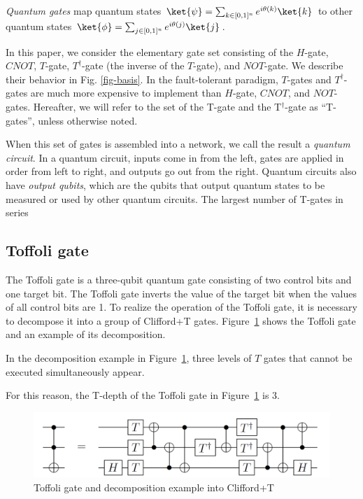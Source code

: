 \emph{Quantum gates} map quantum states $\ket{\psi} = \sum_{k \in [0,1]^n} e^{i {\theta}(k)} \ket{k}$ to
other quantum states $\ket{\phi} = \sum_{j \in [0,1]^n} e^{i {\theta}(j)} \ket{j}$.

In this paper, we consider the elementary gate set consisting of the $H$-gate, $\mathit{CNOT}$, $T$-gate, $T^{\dagger}$-gate  (the inverse of the $T$-gate), and $NOT$-gate. We describe
their behavior in Fig. \ref{fig-basis}. In the fault-tolerant paradigm, $T$-gates and $T^{\dagger}$-gates are much more expensive to implement than
$H$-gate, $CNOT$, and $NOT$-gates. Hereafter, we will refer to the set of the T-gate and the T$^{\dagger}$-gate as ``T-gates'', unless otherwise noted.

When this set of gates is assembled into a network, we call the result a \emph{quantum circuit}. In a quantum circuit, inputs come in from the left, gates are applied in order from left to right, and outputs go out from
the right. Quantum circuits also have \emph{output qubits}, which are the qubits that output quantum states to be measured or used by other quantum circuits. The largest number of T-gates in series

\subsection{Toffoli gate}
The Toffoli gate is a three-qubit quantum gate consisting of two control bits and one target bit.
The Toffoli gate inverts the value of the target bit when the values of all control bits are 1.
To realize the operation of the Toffoli gate, it is necessary to decompose it into a group of Clifford+T gates.
Figure~\ref{toffoli} shows the Toffoli gate and an example of its decomposition\cite{amy2013meet}.
\par
In the decomposition example in Figure~\ref{toffoli}, three levels of $T$ gates that cannot be executed simultaneously appear.

For this reason, the T-depth of the Toffoli gate in Figure~\ref{toffoli} is 3.

\begin{figure}[tbp]

\centering

\includegraphics[width=0.95\linewidth]{img/toffoli.pdf}

\caption{Toffoli gate and decomposition example into Clifford+T\cite{amy2013meet}}

\label{toffoli}

\end{figure}

